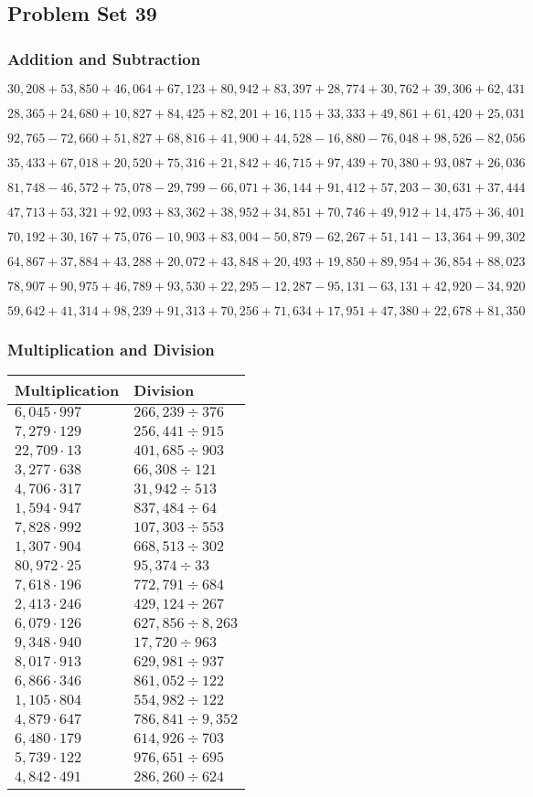 \hypertarget{problem-set-39-4}{%
\subsection{Problem Set 39}\label{problem-set-39-4}}

\hypertarget{addition-and-subtraction-261}{%
\subsubsection{Addition and
Subtraction}\label{addition-and-subtraction-261}}

\(30,208+53,850+46,064+67,123+80,942+83,397+28,774+30,762+39,306+ 62,431\)

\(28,365+24,680+10,827+84,425+82,201+16,115+33,333+49,861+61,420+25,031\)

\(92,765-72,660+51,827+68,816+41,900+44,528-16,880-76,048+98,526-82,056\)

\(35,433+67,018+20,520+75,316+21,842+46,715+97,439+70,380+93,087+26,036\)

\(81,748-46,572+75,078-29,799-66,071+36,144+91,412+57,203-30,631+37,444\)

\(47,713+53,321+92,093+83,362+38,952+34,851+70,746+49,912+14,475+36,401\)

\(70,192+30,167+75,076-10,903+83,004-50,879-62,267+51,141-13,364+99,302\)

\(64,867+37,884+43,288+20,072+43,848+20,493+19,850+89,954+36,854+88,023\)

\(78,907+90,975+46,789+93,530+22,295-12,287-95,131-63,131+42,920-34,920\)

\(59,642+41,314+98,239+91,313+70,256+71,634+17,951+47,380+22,678+81,350\)

\hypertarget{multiplication-and-division-260}{%
\subsubsection{Multiplication and
Division}\label{multiplication-and-division-260}}

\begin{longtable}[]{@{}ll@{}}
\toprule
Multiplication & Division\tabularnewline
\midrule
\endhead
\(6,045\cdot997\) & \(266,239÷376\)\tabularnewline
\(7,279\cdot129\) & \(256,441÷915\)\tabularnewline
\(22,709\cdot13\) & \(401,685÷903\)\tabularnewline
\(3,277\cdot638\) & \(66,308÷121\)\tabularnewline
\(4,706\cdot317\) & \(31,942÷513\)\tabularnewline
\(1,594\cdot947\) & \(837,484÷64\)\tabularnewline
\(7,828\cdot992\) & \(107,303÷553\)\tabularnewline
\(1,307\cdot904\) & \(668,513÷302\)\tabularnewline
\(80,972\cdot25\) & \(95,374÷33\)\tabularnewline
\(7,618\cdot196\) & \(772,791÷684\)\tabularnewline
\(2,413\cdot246\) & \(429,124÷267\)\tabularnewline
\(6,079\cdot126\) & \(627,856÷8,263\)\tabularnewline
\(9,348\cdot940\) & \(17,720÷963\)\tabularnewline
\(8,017\cdot913\) & \(629,981÷937\)\tabularnewline
\(6,866\cdot346\) & \(861,052÷122\)\tabularnewline
\(1,105\cdot804\) & \(554,982÷122\)\tabularnewline
\(4,879\cdot647\) & \(786,841÷9,352\)\tabularnewline
\(6,480\cdot179\) & \(614,926÷703\)\tabularnewline
\(5,739\cdot122\) & \(976,651÷695\)\tabularnewline
\(4,842\cdot491\) & \(286,260÷624\)\tabularnewline
\bottomrule
\end{longtable}

